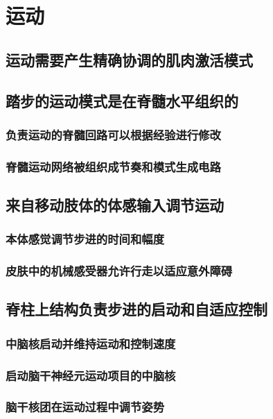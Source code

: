 \chapter{运动}

\section{运动需要产生精确协调的肌肉激活模式}

\section{踏步的运动模式是在脊髓水平组织的}
\subsection{负责运动的脊髓回路可以根据经验进行修改}
\subsection{脊髓运动网络被组织成节奏和模式生成电路}

\section{来自移动肢体的体感输入调节运动}
\subsection{本体感觉调节步进的时间和幅度}
\subsection{皮肤中的机械感受器允许行走以适应意外障碍}

\section{脊柱上结构负责步进的启动和自适应控制}
\subsection{中脑核启动并维持运动和控制速度}
\subsection{启动脑干神经元运动项目的中脑核}
\subsection{脑干核团在运动过程中调节姿势}

